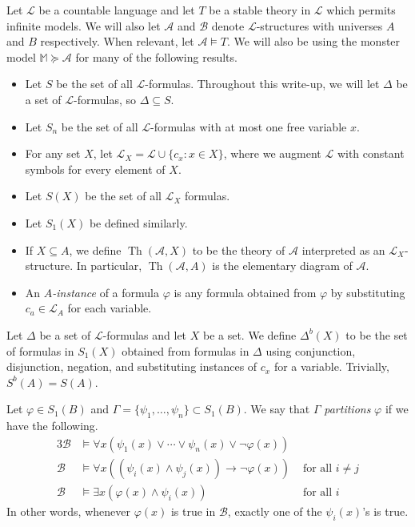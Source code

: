 \documentclass{article}
\newcommand\monster{\mathbb{M}}
\DeclareMathOperator{\Th}{Th}
\let\mc\mathcal
\begin{document}

\begin{notation}[Preliminaries] Let $\mc{L}$ be a countable language and let $T$ be a stable theory in $\mc{L}$ which permits infinite models. We will also let $\mc{A}$ and $\mc{B}$ denote $\mc{L}$-structures with universes $A$ and $B$ respectively. When relevant, let $\mc{A} \vDash T$. We will also be using the monster model $\monster \succeq \mc{A}$ for many of the following results.
    \begin{itemize}
        \item Let $S$ be the set of all $\mc{L}$-formulas. Throughout this write-up, we will let $\Delta$ be a set of $\mc{L}$-formulas, so $\Delta \subseteq S$.
        \item Let $S_n$ be the set of all $\mc{L}$-formulas with at most one free variable $x$.
        \item For any set $X$, let $\mc{L}_X = \mc{L} \cup \{ c_x : x \in X \}$, where we augment $\mc{L}$ with constant symbols for every element of $X$.
        \item Let $S(X)$ be the set of all $\mc{L}_X$ formulas.
        \item Let $S_1(X)$ be defined similarly.
        \item If $X \subseteq A$, we define $\Th(\mc{A}, X)$ to be the theory of $\mc{A}$ interpreted as an $\mc{L}_X$-structure. In particular, $\Th(\mc{A}, A)$ is the elementary diagram of $\mc{A}$.
        \item An \textit{$A$-instance} of a formula $\varphi$ is any formula obtained from $\varphi$ by substituting $c_a \in \mc{L}_A$ for each variable.
    \end{itemize}
\end{notation}

\begin{definition}
    Let $\Delta$ be a set of $\mc{L}$-formulas and let $X$ be a set. We define $\Delta^b(X)$ to be the set of formulas in $S_1(X)$ obtained from formulas in $\Delta$ using conjunction, disjunction, negation, and substituting instances of $c_x$ for a variable. Trivially, $S^b(A) = S(A)$.
\end{definition}

\begin{definition}[Partitioning]
   Let $\varphi \in S_1(B)$ and $\Gamma = \{ \psi_1, \ldots, \psi_n \} \subset S_1(B)$. We say that $\Gamma$ \textit{partitions} $\varphi$ if we have the following.
   \begin{alignat*}{3}
        \mc{B} &\vDash \forall x (\psi_1(x) \lor \cdots \lor \psi_n(x) \lor \neg \varphi(x)) \\
        \mc{B} &\vDash \forall x ((\psi_i(x) \land \psi_j(x)) \to \neg \varphi(x)) &\text{ for all } i \neq j \\
        \mc{B} &\vDash \exists x (\varphi(x) \land \psi_i(x)) &\text{ for all } i
   \end{alignat*}
   In other words, whenever $\varphi(x)$ is true in $\mc{B}$, exactly one of the $\psi_i(x)$'s is true.
\end{definition}
\end{document}
